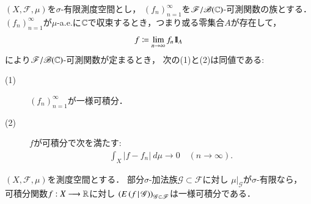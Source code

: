 	\begin{screen}
	\begin{thm}[一様可積分性と平均収束]\label{lem:uniformly_integrable_and_convergence_in_mean}
		$(X,\mathscr{F},\mu)$を$\sigma$-有限測度空間とし，
		$(f_n)_{n=1}^\infty$を$\mathscr{F}/\mathscr{B}(\mathbb{C})$-可測関数の族とする．
		$(f_n)_{n=1}^\infty$が$\mu$-a.e.に$\mathbb{C}$で収束するとき，つまり或る零集合$A$が存在して，
		\begin{align}
			f \coloneqq \lim_{n \to \infty} f_n \mbox{1}\hspace{-0.25em}\mbox{l}_A
		\end{align}
		により$\mathscr{F}/\mathscr{B}(\mathbb{C})$-可測関数が定まるとき，
		次の(1)と(2)は同値である:
		\begin{description}
			\item[(1)] $(f_n)_{n=1}^\infty$が一様可積分．
			\item[(2)] $f$が可積分で次を満たす:
				\begin{align}
					\int_X |f - f_n|\ d\mu 
					\longrightarrow 0
					\quad (n \longrightarrow \infty).
				\end{align}
		\end{description}
	\end{thm}
	\end{screen}
	
	\begin{screen}
	\begin{thm}[一様可積分性と条件付き期待値]\label{lem:uniformly_integrability_and_conditional_expectations}
		$(X,\mathscr{F},\mu)$を測度空間とする．
		部分$\sigma$-加法族$\mathscr{G} \subset \mathscr{F}$に対し
		$\left. \mu \right|_{\mathscr{G}}$が$\sigma$-有限なら，
		可積分関数$f:X \longrightarrow \mathbb{R}$に対し
		$\left( E\left( f \, \middle|\, \mathscr{G} \right) \right)_{\mathscr{G} \subset \mathscr{F}}$は一様可積分である．
	\end{thm}
	\end{screen}
	
